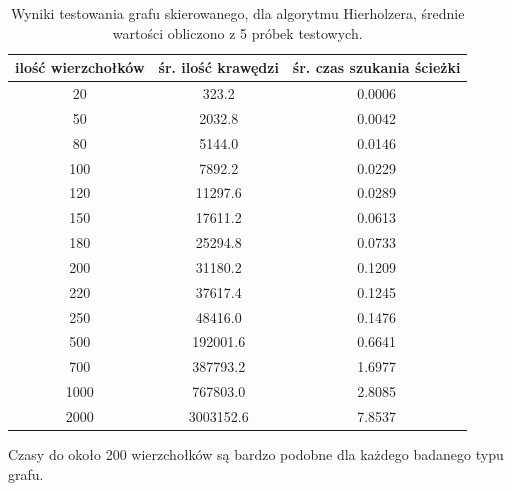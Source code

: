 \documentclass[a4paper, 12pt, twoside, openright]{article}
\begin{document}
\begin{table}[H]
	\centering
	\caption{Wyniki testowania grafu skierowanego, dla algorytmu Hierholzera, średnie wartości obliczono z 5 próbek testowych.}
	
	\resizebox{14.5cm}{!}
	{
		\begin{tabular}{|c c c|}
			\hline
			ilość wierzchołków	& śr. ilość krawędzi 		& śr. czas szukania ścieżki\\ \hline \hline
			20 	& 323.2  		& 0.0006 	\\ \hline
			50 	& 2032.8 		& 0.0042 	\\ \hline
			80 	& 5144.0        & 0.0146	\\ \hline
			100 & 7892.2        & 0.0229	\\ \hline
			120 & 11297.6       & 0.0289	\\ \hline
			150 & 17611.2 		& 0.0613	\\ \hline
			180 & 25294.8       & 0.0733	\\ \hline
			200 & 31180.2  		& 0.1209	\\ \hline
			220 & 37617.4 		& 0.1245	\\ \hline
			250 & 48416.0   	& 0.1476	\\ \hline
			500 & 192001.6   	& 0.6641	\\ \hline				
			700 & 387793.2		& 1.6977	\\ \hline
			1000& 767803.0	    & 2.8085	\\ \hline
			2000& 3003152.6	  	& 7.8537	\\ \hline
		\end{tabular} 
	}
	\label{Tab:Hie_DiG}
\end{table}

Czasy do około 200 wierzchołków są bardzo podobne dla każdego badanego typu grafu.
\end{document}
